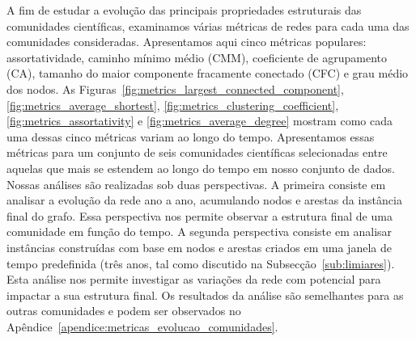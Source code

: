 A fim de estudar a evolução das principais propriedades estruturais das comunidades científicas, examinamos várias métricas 
de redes para cada uma das comunidades consideradas. Apresentamos aqui cinco métricas populares: assortatividade, caminho 
mínimo médio (CMM), coeficiente de agrupamento (CA), tamanho do maior componente fracamente conectado 
(CFC) e grau médio dos nodos. As Figuras~\ref{fig:metrics_largest_connected_component},
\ref{fig:metrics_average_shortest}, \ref{fig:metrics_clustering_coefficient}, \ref{fig:metrics_assortativity} e \ref{fig:metrics_average_degree}
mostram como cada uma dessas cinco métricas variam ao longo do tempo. Apresentamos essas métricas para um conjunto de seis 
comunidades científicas selecionadas entre aquelas que mais se estendem ao longo do tempo em nosso conjunto de dados.
Nossas análises são realizadas sob duas perspectivas. A primeira consiste em analisar a evolução da rede ano a ano, acumulando 
nodos e arestas da instância final do grafo. Essa perspectiva nos permite observar a estrutura final de uma 
comunidade em função do tempo. A segunda perspectiva consiste em analisar instâncias construídas com base em nodos e 
arestas criados em uma janela de tempo predefinida (três anos, tal como discutido na Subsecção~\ref{sub:limiares}). Esta análise 
nos permite investigar as variações da rede com potencial para impactar a sua estrutura final.
Os resultados da análise são semelhantes para as outras comunidades e podem ser observados no 
Apêndice~\ref{apendice:metricas_evolucao_comunidades}.


